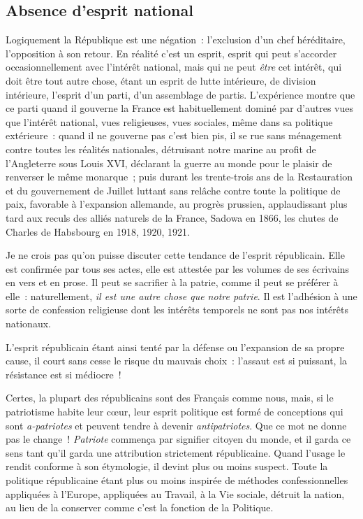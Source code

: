 \documentclass[french,twoside]{book} %
\begin{document}
\subsection[Absence d’esprit national]{Absence d’esprit national}
\noindent Logiquement la République est une négation : l’exclusion d’un chef héréditaire, l’opposition à son retour. En réalité c’est un esprit, esprit qui peut s’accorder occasionnellement avec l’intérêt national, mais qui ne peut \emph{être} cet intérêt, qui doit être tout autre chose, étant un esprit de lutte intérieure, de division intérieure, l’esprit d’un parti, d’un assemblage de partis. L’expérience montre que ce parti quand il gouverne la France est habituellement dominé par d’autres vues que l’intérêt national, vues religieuses, vues sociales, même dans sa politique extérieure : quand il ne gouverne pas c’est bien pis, il se rue sans ménagement contre toutes les réalités nationales, détruisant notre marine au profit de l’Angleterre sous Louis XVI, déclarant la guerre au monde pour le plaisir de renverser le même monarque ; puis durant les trente-trois ans de la Restauration et du gouvernement de Juillet luttant sans relâche contre toute la politique de paix, favorable à l’expansion allemande, au progrès prussien, applaudissant plus tard aux reculs des alliés naturels de la France, Sadowa en 1866, les chutes de Charles de Habsbourg en 1918, 1920, 1921.\par
Je ne crois pas qu’on puisse discuter cette tendance de l’esprit républicain. Elle est confirmée par tous ses actes, elle est attestée par les volumes de ses écrivains en vers et en prose. Il peut se sacrifier à la patrie, comme il peut se préférer à elle : naturellement, \emph{il est une autre chose que notre patrie}. Il est l’adhésion à une sorte de confession religieuse dont les intérêts temporels ne sont pas nos intérêts nationaux.\par
L’esprit républicain étant ainsi tenté par la défense ou l’expansion de sa propre cause, il court sans cesse le risque du mauvais choix : l’assaut est si puissant, la résistance est si médiocre !\par
Certes, la plupart des républicains sont des Français comme nous, mais, si le patriotisme habite leur cœur, leur esprit politique est formé de conceptions qui sont \emph{a-patriotes} et peuvent tendre à devenir \emph{antipatriotes}. Que ce mot ne donne pas le change ! \emph{Patriote} commença par signifier citoyen du monde, et il garda ce sens tant qu’il garda une attribution strictement républicaine. Quand l’usage le rendit conforme à son étymologie, il devint plus ou moins suspect. Toute la politique républicaine étant plus ou moins inspirée de méthodes confessionnelles appliquées à l’Europe, appliquées au Travail, à la Vie sociale, détruit la nation, au lieu de la conserver comme c’est la fonction de la Politique.\par
\end{document}
